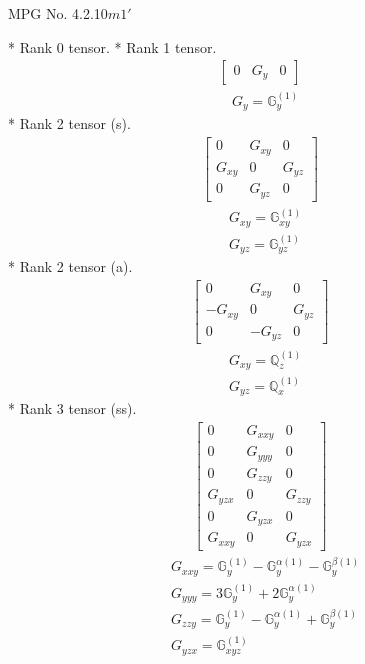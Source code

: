 \documentclass[fleqn,8pt,landscape]{jsarticle}
\begin{document}
\setcounter{MaxMatrixCols}{32}

\renewcommand{\tablename}{Table~}
\renewcommand{\figurename}{Figure~}
\begin{center}
\LARGE
MPG No. 4.2.10\quad$m1'$
\end{center}
* Rank 0 tensor.
* Rank 1 tensor.
\begin{align*}
\begin{bmatrix} 0 & G_{y} & 0 \end{bmatrix}
\end{align*}
\begin{align*}
& G_{y} = \mathbb{G}_{y}^{(1)}
\end{align*}
* Rank 2 tensor (s).
\begin{align*}
\begin{bmatrix} 0 & G_{xy} & 0 \\ G_{xy} & 0 & G_{yz} \\ 0 & G_{yz} & 0 \end{bmatrix}
\end{align*}
\begin{align*}
& G_{xy} = \mathbb{G}_{xy}^{(1)} \\
& G_{yz} = \mathbb{G}_{yz}^{(1)}
\end{align*}
* Rank 2 tensor (a).
\begin{align*}
\begin{bmatrix} 0 & G_{xy} & 0 \\ - G_{xy} & 0 & G_{yz} \\ 0 & - G_{yz} & 0 \end{bmatrix}
\end{align*}
\begin{align*}
& G_{xy} = \mathbb{Q}_{z}^{(1)} \\
& G_{yz} = \mathbb{Q}_{x}^{(1)}
\end{align*}
* Rank 3 tensor (ss).
\begin{align*}
\begin{bmatrix} 0 & G_{xxy} & 0 \\ 0 & G_{yyy} & 0 \\ 0 & G_{zzy} & 0 \\ G_{yzx} & 0 & G_{zzy} \\ 0 & G_{yzx} & 0 \\ G_{xxy} & 0 & G_{yzx} \end{bmatrix}
\end{align*}
\begin{align*}
& G_{xxy} = \mathbb{G}_{y}^{(1)} - \mathbb{G}_{y}^{\alpha(1)} - \mathbb{G}_{y}^{\beta(1)} \\
& G_{yyy} = 3 \mathbb{G}_{y}^{(1)} + 2 \mathbb{G}_{y}^{\alpha(1)} \\
& G_{zzy} = \mathbb{G}_{y}^{(1)} - \mathbb{G}_{y}^{\alpha(1)} + \mathbb{G}_{y}^{\beta(1)} \\
& G_{yzx} = \mathbb{G}_{xyz}^{(1)}
\end{align*}
\end{document}

